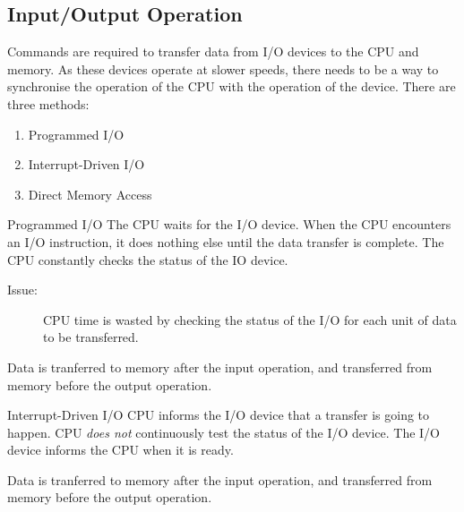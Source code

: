 \documentclass[../notes.tex]{subfiles}
\begin{document}
				\subsection{Input/Output Operation}
					Commands are required to transfer data from I/O devices to the CPU and memory. As these devices operate at slower speeds, there needs to be a way to synchronise the operation of the CPU with the operation of the device. There are three methods:
					\begin{enumerate}[nosep]
						\item Programmed I/O
						\item Interrupt-Driven I/O
						\item Direct Memory Access
					\end{enumerate}
					\begin{definition}{Programmed I/O}
						The CPU waits for the I/O device. When the CPU encounters an I/O instruction, it does nothing else until the data transfer is complete. The CPU constantly checks the status of the IO device.
						\begin{description}
							\item[Issue:] CPU time is wasted by checking the status of the I/O for each unit of data to be transferred.
						\end{description}
						Data is tranferred to memory after the input operation, and transferred from memory before the output operation.
					\end{definition}
					\begin{definition}{Interrupt-Driven I/O}
						CPU informs the I/O device that a transfer is going to happen. CPU \emph{does not} continuously test the status of the I/O device. The I/O device informs the CPU when it is ready.
						\par Data is tranferred to memory after the input operation, and transferred from memory before the output operation.
					\end{definition}
\end{document}
